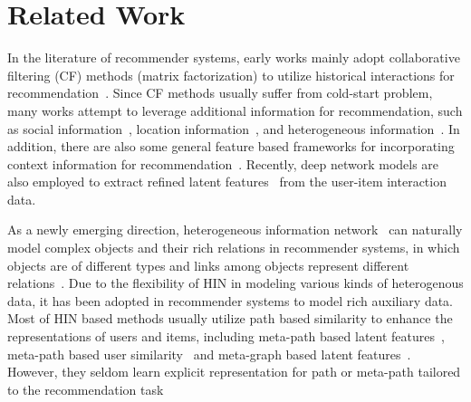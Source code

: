 \section{Related Work}
In the literature of recommender systems, early works mainly adopt collaborative filtering (CF) methods (\eg matrix factorization) to utilize historical interactions for recommendation~\cite{koren2009matrix}. Since CF methods usually suffer from cold-start problem, many works attempt to leverage additional information for recommendation, such as social information~\cite{wang2016social,zhao2014we,zhao2016connecting}, location information~\cite{yin2013lcars}, and heterogeneous information~\cite{feng2012incorporating}.
In addition, there are also some general feature based frameworks for incorporating context information for recommendation~\cite{rendle2010factorization,chen2012svdfeature,he2017neural2}.
 Recently, deep network models are also employed to extract refined latent features~\cite{he2017neural} from the user-item interaction data. 


As a newly emerging direction, heterogeneous information network~\cite{shi2017survey} can naturally model complex objects and their rich relations in recommender systems, in which objects are of different types and links among objects represent different relations~\cite{sun2011pathsim,shi2014hetesim}. 
Due to the flexibility of  HIN in modeling  various kinds of heterogenous data, it has been adopted
  in recommender systems to model rich auxiliary data.
Most of HIN based methods usually utilize path based similarity to enhance the representations of users and items, including meta-path based latent features~\cite{yu2014personalized}, meta-path based user similarity~\cite{shi2015semantic,liu2017personalized} and 
meta-graph based latent features~\cite{zhao2017meta}.  However, they seldom learn explicit representation for path or meta-path tailored to the recommendation task

